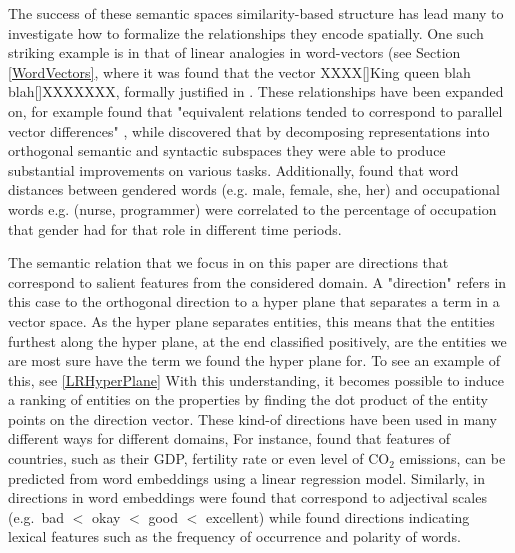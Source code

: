 The success of these semantic spaces similarity-based structure has lead many to investigate how to formalize the relationships they encode spatially. One such striking example is in that of linear analogies in word-vectors (see Section \ref{WordVectors}, where it was found that the vector XXXX[]King queen blah blah[]XXXXXXX, formally justified in \cite{Ethayarajh2018}. %
These relationships have been expanded on, for example \cite{TomasMikolovWen-tauYih2013} found that "equivalent relations tended to correspond to parallel vector differences" \cite{Mitchell2015}, while \cite{Mitchell2015} discovered that by decomposing representations into orthogonal semantic and syntactic subspaces they were able to produce substantial improvements on various tasks. Additionally, \cite{Garg2017} found that word distances between gendered words (e.g. male, female, she, her) and occupational words e.g. (nurse, programmer) were correlated to the percentage of occupation that gender had for that role in different time periods. %


The semantic relation that we focus in on this paper are directions that correspond to salient features from the considered domain. A "direction" refers in this case to the orthogonal direction to a hyper plane that separates a term in a vector space. As the hyper plane separates entities, this means that the entities furthest along the hyper plane, at the end classified positively, are the entities we are most sure have the term we found the hyper plane for. To see an example of this, see \ref {LRHyperPlane} With this understanding, it becomes possible to induce a ranking of entities on the properties by finding the dot product of the entity points on the direction vector. These kind-of directions have been used in many different ways for different domains, For instance,  \cite{gupta2015distributional} found that features of countries, such as their GDP, fertility rate or even level of CO$_2$ emissions, can be predicted from word embeddings using a linear regression model. Similarly, in \cite{kim2013deriving} directions in word embeddings were found that correspond to adjectival scales (e.g.\ bad $<$ okay $<$ good $<$ excellent) while \cite{DBLP:conf/acl/RotheS16} found directions indicating lexical features such as the frequency of occurrence and polarity of words. 


